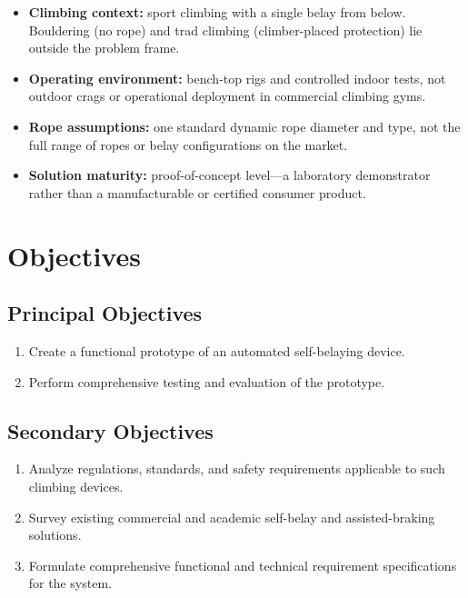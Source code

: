 \begin{itemize}
    \item \textbf{Climbing context:} sport climbing with a single belay
        from below. Bouldering (no rope) and trad climbing
        (climber-placed protection) lie outside the problem frame.
    \item \textbf{Operating environment:} bench-top rigs and controlled
        indoor tests, not outdoor crags or operational deployment in
        commercial climbing gyms.
    \item \textbf{Rope assumptions:} one standard dynamic rope diameter and
        type, not the full range of ropes or belay configurations on the
        market.
    \item \textbf{Solution maturity:} proof-of-concept level---a laboratory
        demonstrator rather than a manufacturable or certified consumer
        product.
\end{itemize}

\section{Objectives}
\label{sec:objectives}

\subsection{Principal Objectives}
\label{sec:principal-objectives}

\begin{enumerate}
    \item Create a functional prototype of an automated self-belaying
        device.
    \item Perform comprehensive testing and evaluation of the prototype.
\end{enumerate}

\subsection{Secondary Objectives}
\label{sec:secondary-objectives}

\begin{enumerate}
    \item Analyze regulations, standards, and safety requirements
        applicable to such climbing devices.
    \item Survey existing commercial and academic self-belay and
        assisted-braking solutions.
    \item Formulate comprehensive functional and technical requirement
        specifications for the system.
\end{enumerate}

